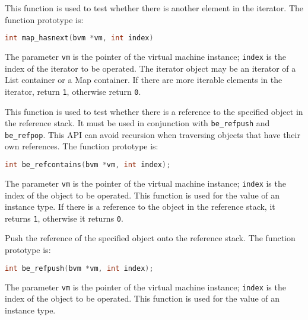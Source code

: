 
This function is used to test whether there is another element in the iterator. The function prototype is:
\begin{lstlisting}[language=c, style=berry, numbers=none]
int map_hasnext(bvm *vm, int index)
\end{lstlisting}
The parameter \texttt{vm} is the pointer of the virtual machine instance; \texttt{index} is the index of the iterator to be operated. The iterator object may be an iterator of a List container or a Map container. If there are more iterable elements in the iterator, return \texttt{1}, otherwise return \texttt{0}.

This function is used to test whether there is a reference to the specified object in the reference stack. It must be used in conjunction with \texttt{be\_refpush} and \texttt{be\_refpop}. This API can avoid recursion when traversing objects that have their own references. The function prototype is:
\begin{lstlisting}[language=c, style=berry, numbers=none]
int be_refcontains(bvm *vm, int index);
\end{lstlisting}
The parameter \texttt{vm} is the pointer of the virtual machine instance; \texttt{index} is the index of the object to be operated. This function is used for the value of an instance type. If there is a reference to the object in the reference stack, it returns \texttt{1}, otherwise it returns \texttt{0}.


Push the reference of the specified object onto the reference stack. The function prototype is:
\begin{lstlisting}[language=c, style=berry, numbers=none]
int be_refpush(bvm *vm, int index);
\end{lstlisting}
The parameter \texttt{vm} is the pointer of the virtual machine instance; \texttt{index} is the index of the object to be operated. This function is used for the value of an instance type.


